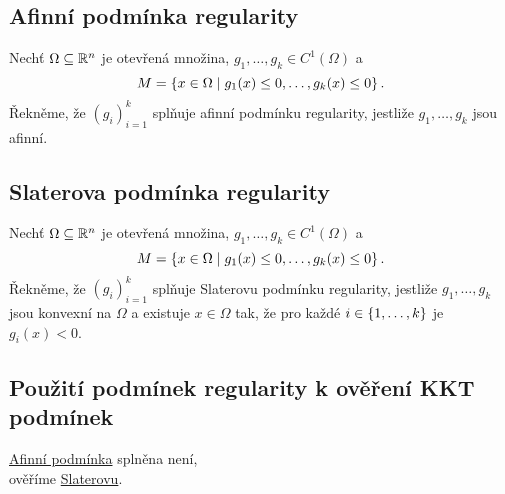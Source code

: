 \subsection{Afinní podmínka regularity}\label{afinniPodm}
Nechť $\Omega \subseteq \mathbb{R}^n$ je otevřená množina, $g_1, \dots, g_k \in C^1 (\Omega)$ a 
\[
    M = \left\lbrace x \in \Omega \mid g_1(x) \leq 0, \dots, g_k(x) \leq 0 \right\rbrace.
\]
Řekněme, že $(g_i)_{i=1}^k$ splňuje afinní podmínku regularity, jestliže $g_1, \dots, g_k$ jsou afinní.

\subsection{Slaterova podmínka regularity}\label{slaterPodm}
Nechť $\Omega \subseteq \mathbb{R}^n$ je otevřená množina, $g_1, \dots, g_k \in C^1 (\Omega)$ a 
\[
    M = \left\lbrace x \in \Omega \mid g_1(x) \leq 0, \dots, g_k(x) \leq 0 \right\rbrace.
\]
Řekněme, že $(g_i)_{i=1}^k$ splňuje Slaterovu podmínku regularity, jestliže $g_1, \dots, g_k$ jsou konvexní na $\Omega$
a existuje $x \in \Omega$ tak, že pro každé $i \in \left\lbrace 1, \dots, k \right\rbrace$ je $g_i(x) < 0$.

\subsection{Použití podmínek regularity k ověření KKT podmínek}
\begin{multicols}{2}
    \hyperref[afinniPodm]{Afinní podmínka} splněna není, \\ ověříme \hyperref[slaterPodm]{Slaterovu}.

\columnbreak

    \begin{figure}[H]
    \end{figure}
\end{multicols}

